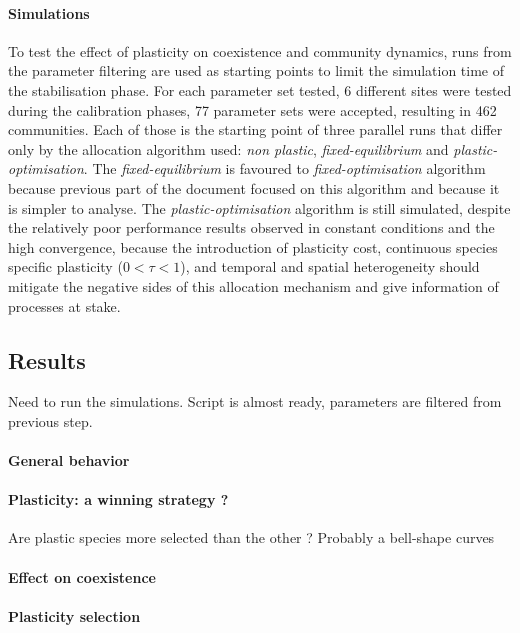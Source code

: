 \paragraph{Simulations}
To test the effect of plasticity on coexistence and community dynamics, runs from the parameter filtering are used as starting points to limit the simulation time of the stabilisation phase. For each parameter set tested, 6 different sites were tested during the calibration phases, 77 parameter sets were accepted, resulting in 462 communities. Each of those is the starting point of three parallel runs that differ only by the allocation algorithm used: \textit{non plastic}, \textit{fixed-equilibrium} and \textit{plastic-optimisation}. The \textit{fixed-equilibrium} is favoured to \textit{fixed-optimisation} algorithm because previous part of the document focused on this algorithm and because it is simpler to analyse. The \textit{plastic-optimisation} algorithm is still simulated, despite the relatively poor performance results observed in constant conditions and the high convergence, because the introduction of plasticity cost, continuous species specific plasticity ($0 < \tau < 1$), and temporal and spatial heterogeneity should mitigate the negative sides of this allocation mechanism and give information of processes at stake.




\subsection{Results}

Need to run the simulations. Script is almost ready, parameters are filtered from previous step.

\paragraph{General behavior}
\paragraph{Plasticity: a winning strategy ?}
Are plastic species more selected than the other ? Probably a bell-shape curves

\paragraph{Effect on coexistence}

\paragraph{Plasticity selection}

